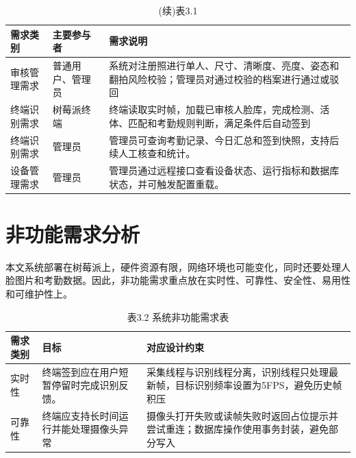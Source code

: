 \documentclass[UTF8]{heuthesis}
\begin{document}
\begingroup
\small
\begin{longtable}{|>{\raggedright\arraybackslash}p{}|>{\raggedright\arraybackslash}p{}|>{\raggedright\arraybackslash}p{}|}
\caption{(续)表3.1}\\
\hline
需求类别 & 主要参与者 & 需求说明 \\
\hline
审核管理需求 & 普通用户、管理员 & 系统对注册照进行单人、尺寸、清晰度、亮度、姿态和翻拍风险校验；管理员对通过校验的档案进行通过或驳回 \\
\hline
终端识别需求 & 树莓派终端 & 终端读取实时帧，加载已审核人脸库，完成检测、活体、匹配和考勤规则判断，满足条件后自动签到 \\
\hline
终端识别需求 & 管理员 & 管理员可查询考勤记录、今日汇总和签到快照，支持后续人工核查和统计。 \\
\hline
设备管理需求 & 管理员 & 管理员通过远程接口查看设备状态、运行指标和数据库状态，并可触发配置重载。 \\
\hline
\end{longtable}
\endgroup

\section{非功能需求分析}
本文系统部署在树莓派上，硬件资源有限，网络环境也可能变化，同时还要处理人脸图片和考勤数据。因此，非功能需求重点放在实时性、可靠性、安全性、易用性和可维护性上。

\begingroup
\small
\begin{longtable}{|>{\raggedright\arraybackslash}p{}|>{\raggedright\arraybackslash}p{}|>{\raggedright\arraybackslash}p{}|}
\caption{表3.2 系统非功能需求表}\\
\hline
需求类别 & 目标 & 对应设计约束 \\
\hline
实时性 & 终端签到应在用户短暂停留时完成识别反馈。 & 采集线程与识别线程分离，识别线程只处理最新帧，目标识别频率设置为5FPS，避免历史帧积压 \\
\hline
可靠性 & 终端应支持长时间运行并能处理摄像头异常 & 摄像头打开失败或读帧失败时返回占位提示并尝试重连；数据库操作使用事务封装，避免部分写入 \\
\hline
\end{longtable}
\endgroup
\end{document}
